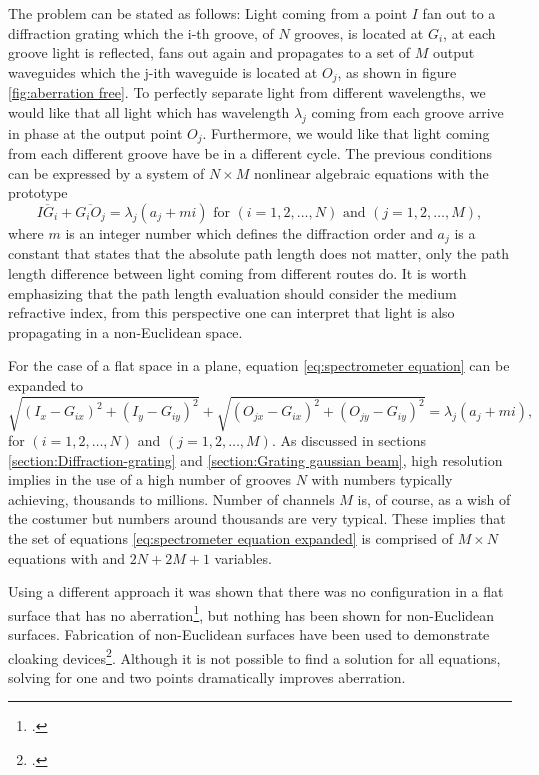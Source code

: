 \documentclass[12pt,twoside,english]{book}
\renewcommand{\~}{\perispomeni}%
\numberwithin{equation}{section}
\numberwithin{figure}{section}
\begin{document}
The problem can be stated as follows: Light coming from a point $I$ fan out to a diffraction grating which the i-th groove, of $N$ grooves, is located at $G_{i}$, at each groove light is reflected, fans out again and propagates to a set of $M$ output waveguides which the j-ith waveguide is located at $O_{j}$, as shown in figure \ref{fig:aberration free}. To perfectly separate light from different wavelengths, we would like that all light which has wavelength $\lambda_{j}$ coming from each groove arrive in phase at the output point $O_{j}$. Furthermore, we would like that light coming from each different groove have be in a different cycle. The previous conditions can be expressed by a system of $N\times M$ nonlinear algebraic equations with the prototype
\begin{equation}
\overline{IG_{i}}+\overline{G_{i}O_{j}}=\lambda_{j}\left(a_{j}+mi\right)\text{ for }\left(i=1,2,\dots,N\right)\text{ and }\left(j=1,2,\dots,M\right),\label{eq:spectrometer equation}\end{equation}
where $m$ is an integer number which defines the diffraction order and $a_{j}$ is a constant that states that the absolute path length does not matter, only the path length difference between light coming from different routes do. It is worth emphasizing that the path length evaluation should consider the medium refractive index, from this perspective one can interpret that light is also propagating in a non-Euclidean space.

For the case of a flat space in a plane, equation \ref{eq:spectrometer equation} can be expanded to
\begin{equation}
\sqrt{\left(I_{x}-G_{ix}\right)^{2}+\left(I_{y}-G_{iy}\right)^{2}}+\sqrt{\left(O_{jx}-G_{ix}\right)^{2}+\left(O_{jy}-G_{iy}\right)^{2}}=\lambda_{j}\left(a_{j}+mi\right),
\label{eq:spectrometer equation expanded}
\end{equation}
for $\left(i=1,2,\dots,N\right)$ and $\left(j=1,2,\dots,M\right)$. As discussed in sections \ref{section:Diffraction-grating} and \ref{section:Grating gaussian beam}, high resolution implies in the use of a high number of grooves $N$ with numbers typically achieving, thousands to millions. Number of channels $M$ is, of course, as a wish of the costumer but numbers around thousands are very typical. These implies that the set of equations \ref{eq:spectrometer equation expanded} is comprised of $M\times N$ equations with and $2N+2M+1$ variables.

Using a different approach it was shown that there was no configuration in a flat surface that has no aberration\footcite{Marz:1992p28,Beutler:1945p8,Namioka:1959p48,Velzel:1976p67}, but nothing has been shown for non-Euclidean surfaces. Fabrication of non-Euclidean surfaces have been used to demonstrate cloaking devices\footcite{Gabrielli:2009p1173}. Although it is not possible to find a solution for all equations, solving for one and two points dramatically improves aberration. 
\end{document}
